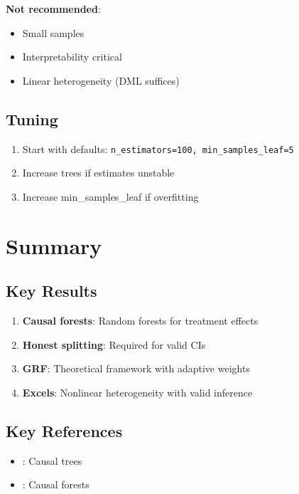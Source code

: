\textbf{Not recommended}:
\begin{itemize}
    \item Small samples
    \item Interpretability critical
    \item Linear heterogeneity (DML suffices)
\end{itemize}

\subsection{Tuning}

\begin{enumerate}
    \item Start with defaults: \texttt{n\_estimators=100, min\_samples\_leaf=5}
    \item Increase trees if estimates unstable
    \item Increase min\_samples\_leaf if overfitting
\end{enumerate}

\section{Summary}
\label{sec:forest_summary}

\subsection{Key Results}

\begin{enumerate}
    \item \textbf{Causal forests}: Random forests for treatment effects
    \item \textbf{Honest splitting}: Required for valid CIs
    \item \textbf{GRF}: Theoretical framework with adaptive weights
    \item \textbf{Excels}: Nonlinear heterogeneity with valid inference
\end{enumerate}

\subsection{Key References}

\begin{itemize}
    \item \cite{athey2016recursive}: Causal trees
    \item \cite{wager2018estimation}: Causal forests
\end{itemize}
